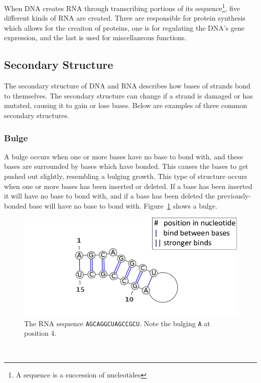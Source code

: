 When DNA creates RNA through transcribing portions of its sequence\footnote{A 
sequence is a succession of nucleotides}, five different kinds of RNA are 
created. Three are responsible for protein synthesis which allows for the creaiton 
of proteins, one is for regulating the DNA's gene expression, and the last 
is used for miscellaneous functions\cite[p. 236, table 7-1]{alberts}.
\subsection{Secondary Structure}\label{structs}
The secondary structure of DNA and RNA describes how bases of 
strands bond to themselves. The secondary structure can change if 
a strand is damaged or has mutated, causing it to gain or lose 
bases. Below are examples of three common secondary structures.

\subsubsection{Bulge}
A bulge occurs when one or more bases have no base to bond with, and these 
bases are surrounded by bases which have bonded. This causes the bases to get 
pushed out slightly, resembling a bulging growth. This type of structure occurs 
when one or more bases has been inserted or deleted. If a base has been 
inserted it will have no base to bond with, and if a base has been deleted 
the previously-bonded base will have no base to bond with. Figure~\ref{fig:bulge} shows a bulge.

\begin{figure}[H]
\centering
\includegraphics[scale=0.4]{./lib/bulge.png}
\caption{The RNA sequence {\tt AGCAGGCUAGCCGCU}. Note the bulging {\tt A} at position 4.}
\label{fig:bulge}
\end{figure}~
\\
